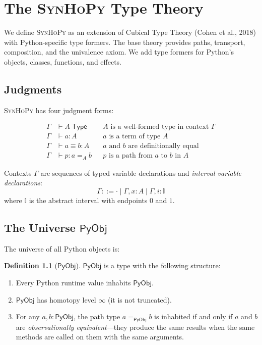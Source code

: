 \documentclass[11pt,a4paper]{report}
\theoremstyle{definition}
\newtheorem{definition}{Definition}[chapter]
\theoremstyle{plain}
\newcommand{\Type}{\mathsf{Type}}
\newcommand{\PyObj}{\mathsf{PyObj}}
\newcommand{\interval}{\mathbb{I}}
\newcommand{\synhopy}{\textsc{SynHoPy}}
\begin{document}
\chapter{The \synhopy{} Type Theory}
\label{ch:type-theory}

We define \synhopy{} as an extension of Cubical Type Theory (Cohen et al., 2018)
with Python-specific type formers. The base theory provides paths, transport,
composition, and the univalence axiom. We add type formers for Python's objects,
classes, functions, and effects.

\section{Judgments}

\synhopy{} has four judgment forms:

\begin{align}
  \Gamma &\vdash A \; \Type && \text{$A$ is a well-formed type in context $\Gamma$} \\
  \Gamma &\vdash a : A && \text{$a$ is a term of type $A$} \\
  \Gamma &\vdash a \equiv b : A && \text{$a$ and $b$ are definitionally equal} \\
  \Gamma &\vdash p : a =_A b && \text{$p$ is a path from $a$ to $b$ in $A$}
\end{align}

Contexts $\Gamma$ are sequences of typed variable declarations and \emph{interval
variable declarations}:
\[
  \Gamma ::= \cdot \mid \Gamma, x : A \mid \Gamma, i : \interval
\]
where $\interval$ is the abstract interval with endpoints $0$ and $1$.

\section{The Universe $\PyObj$}

The universe of all Python objects is:

\begin{definition}[$\PyObj$]
$\PyObj$ is a type with the following structure:
\begin{enumerate}
  \item Every Python runtime value inhabits $\PyObj$.
  \item $\PyObj$ has homotopy level $\infty$ (it is not truncated).
  \item For any $a, b : \PyObj$, the path type $a =_{\PyObj} b$ is inhabited
    if and only if $a$ and $b$ are \emph{observationally equivalent}---they
    produce the same results when the same methods are called on them with
    the same arguments.
\end{enumerate}
\end{definition}
\end{document}
